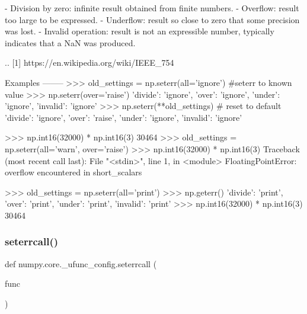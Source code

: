 \begin{DoxyVerb}
- Division by zero: infinite result obtained from finite numbers.
- Overflow: result too large to be expressed.
- Underflow: result so close to zero that some precision
  was lost.
- Invalid operation: result is not an expressible number, typically
  indicates that a NaN was produced.

.. [1] https://en.wikipedia.org/wiki/IEEE_754

Examples
--------
>>> old_settings = np.seterr(all='ignore')  #seterr to known value
>>> np.seterr(over='raise')
{'divide': 'ignore', 'over': 'ignore', 'under': 'ignore', 'invalid': 'ignore'}
>>> np.seterr(**old_settings)  # reset to default
{'divide': 'ignore', 'over': 'raise', 'under': 'ignore', 'invalid': 'ignore'}

>>> np.int16(32000) * np.int16(3)
30464
>>> old_settings = np.seterr(all='warn', over='raise')
>>> np.int16(32000) * np.int16(3)
Traceback (most recent call last):
  File "<stdin>", line 1, in <module>
FloatingPointError: overflow encountered in short_scalars

>>> old_settings = np.seterr(all='print')
>>> np.geterr()
{'divide': 'print', 'over': 'print', 'under': 'print', 'invalid': 'print'}
>>> np.int16(32000) * np.int16(3)
30464\end{DoxyVerb}
 \mbox{\label{namespacenumpy_1_1core_1_1__ufunc__config_acf6a2cd80c820dd631915a45ece44095}} 
\subsubsection{\texorpdfstring{seterrcall()}{seterrcall()}}
{\footnotesize\ttfamily def numpy.\+core.\+\_\+ufunc\+\_\+config.\+seterrcall (\begin{DoxyParamCaption}\item[{}]{func }\end{DoxyParamCaption})}

